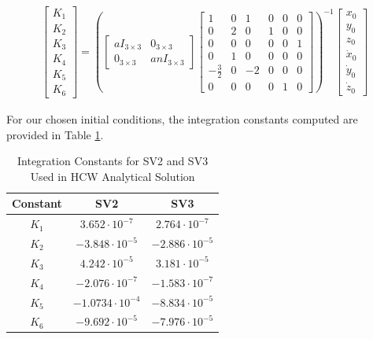 \begin{align}
    \begin{bmatrix}
K_1 \\ K_2 \\ K_3 \\ K_4 \\ K_5 \\ K_6
\end{bmatrix} = \left(\begin{bmatrix}
a I_{3 \times 3} & 0_{3 \times 3} \\
0_{3 \times 3} & a n I_{3 \times 3}
\end{bmatrix}
\begin{bmatrix}
1 & 0 & 1 & 0 & 0 & 0 \\
0 & 2 & 0 & 1 & 0 & 0 \\
0 & 0 & 0 & 0 & 0 & 1 \\
0 & 1 & 0 & 0 & 0 & 0 \\
-\frac{3}{2} & 0 & -2 & 0 & 0 & 0 \\
0 & 0 & 0 & 0 & 1 & 0
\end{bmatrix}\right)^{-1} \begin{bmatrix}
x_0 \\ y_0 \\ z_0 \\ \dot{x}_0 \\ \dot{y}_0 \\ \dot{z}_0
\end{bmatrix}
\end{align}

For our chosen initial conditions, the integration constants computed are provided in Table \ref{tab:integration_constants_HCW}.

\begin{table}[ht]
    \centering
    \renewcommand{\arraystretch}{1.2}
    \begin{tabular}{c c c}
        \toprule
        \textbf{Constant} & \textbf{SV2} & \textbf{SV3} \\
        \midrule
        $K_1$ & $3.652\cdot10^{-7}$ & $2.764\cdot10^{-7}$ \\
        $K_2$ & $-3.848\cdot10^{-5}$ & $-2.886\cdot10^{-5}$ \\
        $K_3$ & $4.242\cdot10^{-5}$& $3.181\cdot10^{-5}$\\
        $K_4$ & $-2.076\cdot10^{-7}$ & $-1.583\cdot10^{-7}$ \\
        $K_5$ & $-1.0734\cdot10^{-4}$ & $-8.834\cdot10^{-5}$ \\
        $K_6$ & $-9.692\cdot10^{-5}$ & $-7.976\cdot10^{-5}$ \\
        \bottomrule
    \end{tabular}
    \caption{Integration Constants for SV2 and SV3 Used in HCW Analytical Solution}
    \label{tab:integration_constants_HCW}
\end{table}


